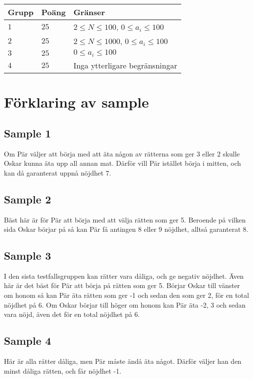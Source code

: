 \noindent
\begin{tabular}{| l | l | p{12cm} |}
  \hline
  \textbf{Grupp} & \textbf{Poäng} & \textbf{Gränser} \\ \hline
  $1$    & $25$      & $2 \le N \le 100$, $0 \le a_i \le 100$ \\ \hline
  $2$    & $25$      & $2 \le N \le 1000$, $0 \le a_i \le 100$ \\ \hline
  $3$    & $25$      & $0 \le a_i \le 100$ \\ \hline
  $4$    & $25$      & Inga ytterligare begränsningar  \\ \hline
\end{tabular}

\section*{Förklaring av sample}
\subsection*{Sample 1}
Om Pär väljer att börja med att äta någon av rätterna som ger $3$ eller $2$ skulle Oskar kunna äta upp all annan mat. Därför vill Pär istället börja i mitten, och kan då garanterat uppnå nöjdhet $7$.
\subsection*{Sample 2}
Bäst här är för Pär att börja med att välja rätten som ger 5. Beroende på vilken sida Oskar börjar på så kan Pär få antingen 8 eller 9 nöjdhet, alltså garanterat 8.
\subsection*{Sample 3}
I den sista testfallsgruppen kan rätter vara dåliga, och ge negativ nöjdhet. Även här är det bäst för Pär att börja på rätten som ger 5. Börjar Oskar till vänster om honom så kan Pär äta rätten som ger -1 och sedan den som ger 2, för en total nöjdhet på 6. Om Oskar börjar till höger om honom kan Pär äta -2, 3 och sedan vara nöjd, även det för en total nöjdhet på 6.
\subsection*{Sample 4}
Här är alla rätter dåliga, men Pär måste ändå äta något. Därför väljer han den minst dåliga rätten, och får nöjdhet -1.
